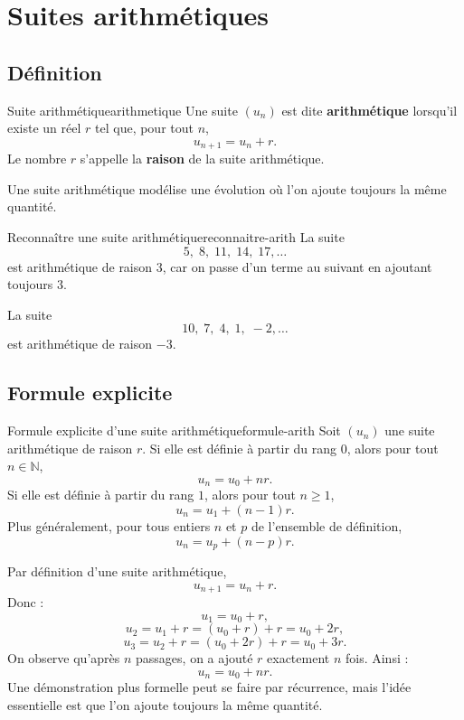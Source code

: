\documentclass[11pt,a4paper]{article}
\newcommand{\N}{\mathbb{N}}
\begin{document}
\section{Suites arithmétiques}

\subsection{Définition}

\begin{definitionbox}{Suite arithmétique}{arithmetique}
Une suite $(u_n)$ est dite \textbf{arithmétique} lorsqu'il existe un réel $r$ tel que, pour tout $n$,
\[
 u_{n+1}=u_n+r.
\]
Le nombre $r$ s'appelle la \textbf{raison} de la suite arithmétique.
\end{definitionbox}

\begin{rememberbox}
Une suite arithmétique modélise une évolution où l'on ajoute toujours la même quantité.
\end{rememberbox}

\begin{examplebox}{Reconnaître une suite arithmétique}{reconnaitre-arith}
La suite
\[
5,\;8,\;11,\;14,\;17,\ldots
\]
est arithmétique de raison $3$, car on passe d'un terme au suivant en ajoutant toujours $3$.

La suite
\[
10,\;7,\;4,\;1,\;-2,\ldots
\]
est arithmétique de raison $-3$.
\end{examplebox}

\subsection{Formule explicite}

\begin{theorembox}{Formule explicite d'une suite arithmétique}{formule-arith}
Soit $(u_n)$ une suite arithmétique de raison $r$.
Si elle est définie à partir du rang $0$, alors pour tout $n\in\N$,
\[
 u_n=u_0+nr.
\]
Si elle est définie à partir du rang $1$, alors pour tout $n\geq1$,
\[
 u_n=u_1+(n-1)r.
\]
Plus généralement, pour tous entiers $n$ et $p$ de l'ensemble de définition,
\[
 u_n=u_p+(n-p)r.
\]
\end{theorembox}

\begin{proofbox}
Par définition d'une suite arithmétique,
\[
 u_{n+1}=u_n+r.
\]
Donc :
\[
 u_1=u_0+r,
\]
\[
 u_2=u_1+r=(u_0+r)+r=u_0+2r,
\]
\[
 u_3=u_2+r=(u_0+2r)+r=u_0+3r.
\]
On observe qu'après $n$ passages, on a ajouté $r$ exactement $n$ fois. Ainsi :
\[
 u_n=u_0+nr.
\]
Une démonstration plus formelle peut se faire par récurrence, mais l'idée essentielle est que l'on ajoute toujours la même quantité.
\end{proofbox}
\end{document}
